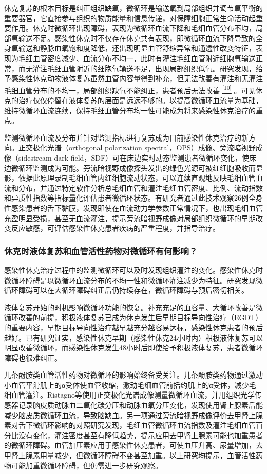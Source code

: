 休克复苏的根本目标是纠正组织缺氧，微循环是输送氧到局部组织并调节氧平衡的重要器官，它直接参与组织的物质能量和信息传递，对保障细胞正常生命活动起重要作用。休克时微循环出现障碍，表现为微循环血流下降和毛细血管分布不均，局部氧输送不足。感染性休克时不仅存在休克共有表现，即微循环血流下降导致的全身氧输送和静脉血氧饱和度降低，还出现明显血管舒缩异常和通透性改变特征，表现为毛细血管密度减少、血流分布不均一，此时有灌注毛细血管附近细胞氧输送正常，而无灌注毛细血管附近的细胞氧输送不足，出现局部组织低氧。研究发现，给予感染性休克动物液体复苏虽然血管内容量得到补充，但无法改善有灌注和无灌注毛细血管分布的不均一，局部组织缺氧不能纠正，患者预后无法改善
\protect\hyperlink{text00010.htmlux5cux23ch10-9}{\textsuperscript{{[}10{]}}}
。可见休克的治疗仅仅停留在液体复苏的层面是远远不够的。以提高微循环血流量为基础，维持微循环血流连续，保持毛细血管分布均一性可能成为将来感染性休克治疗的重点。

监测微循环血流及分布并针对监测指标进行复苏成为目前感染性休克治疗的新方向。正交极化光谱（orthogonal
polarization spectral，OPS）成像、旁流暗视野成像（sidestream dark
field，SDF）可在床边实时动态监测患者微循环变化，使床边微循环监测成为可能。旁流暗视野成像探头发出的绿色光源可被红细胞吸收而显影，依据此原理录制毛细血管内红细胞流动状态，可以连续直观地反映毛细血管血流和分布，并通过特定软件分析总毛细血管和灌注毛细血管密度、比例、流动指数和异质性指数等指标量化评估患者微循环状态。有研究者通过此技术观察26例全身性感染患者的舌下黏膜，发现即使在血流动力学参数正常情况下，也出现毛细血管充盈明显受损，甚至无血流灌注，提示旁流暗视野成像对局部组织微循环的早期改变反应敏感，可评估感染性休克患者疾病的严重程度，并指导治疗。

\subsubsection{休克时液体复苏和血管活性药物对微循环有何影响？}

感染性休克治疗过程中的监测微循环可以及时发现组织灌注的变化。感染性休克时微循环障碍是以微循环血流分布的不均一性和微循环灌注减少为特征。研究发现微循环障碍可以在大循环障碍纠正后仍持续存在，微循环障碍与预后密切相关。

液体复苏开始的时机影响微循环功能的恢复。补充充足的血容量、大循环改善是微循环改善的前提，积极液体复苏已成为休克发生后早期目标导向性治疗（EGDT）的重要内容，早期目标导向性治疗越早越充分越容易达标，感染性休克患者的预后越好。已有研究证实，感染性休克早期（感染性休克24小时内）积极液体复苏可以明显改善微循环，而感染性休克发生48小时后即使给予积极液体复苏，患者微循环障碍也很难纠正。

儿茶酚胺类血管活性药物对微循环的影响始终备受关注。儿茶酚胺类药物通过激动小血管平滑肌上的α受体使血管收缩，激动毛细血管前括约肌上的α受体，减少毛细血管灌注。Ristagno等使用正交极化光谱成像测量微循环血流，并用组织光学传感器记录脑皮质动脉血二氧化碳分压和动脉血氧分压变化，发现使用肾上腺素后能减少脑皮质微循环血流，导致脑缺血。另一项通过旁流暗视野成像评价去甲肾上腺素对舌下微循环影响的对照研究发现，毛细血管微循环血流指数及灌注毛细血管百分比没有变化，灌注密度甚至有降低趋势，提示应用去甲肾上腺素可能也加重患者的微循环障碍。血管加压素应用于感染性休克患者，可使血压升高、尿量增加，去甲肾上腺素用量减少，但微循环障碍不变甚至加重。以上研究均提示，血管活性药物可能加重微循环障碍，但仍需进一步研究观察。

